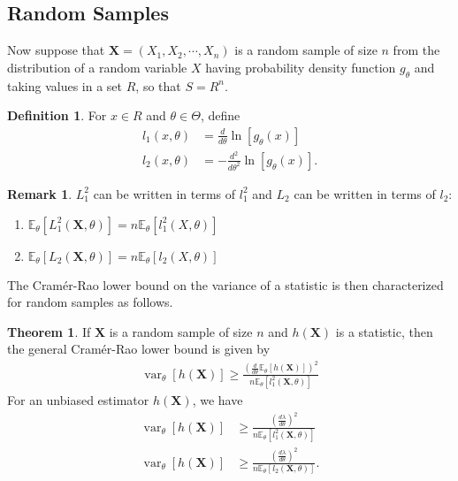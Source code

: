 \documentclass[a4paper,12pt]{article}
\theoremstyle{definition}
\newtheorem{theorem}{Theorem}[section]
\theoremstyle{definition}
\theoremstyle{definition}
\newtheorem{definition}{Definition}[section]
\newtheorem*{remark}{Remark}
\newcommand{\bs}{\boldsymbol}
\newcommand{\var}{\operatorname{var}}
\begin{document}
    \subsection*{Random Samples}
    Now suppose that $\bs{X} = (X_1, X_2, \cdots, X_n)$ is a random sample of size $n$ from the distribution of a random variable $X$ having probability density function $g_\theta$ and taking values in a set $R$, so that $S = R^n$.
    \begin{definition}
        For $x \in R$ and $\theta \in \Theta$, define
        \begin{align*}
            l_1(x, \theta) &= \frac{d}{d\theta} \ln[g_\theta(x)] \\
            l_2(x, \theta) &= -\frac{d^2}{d\theta^2} \ln[g_\theta(x)].
        \end{align*}
    \end{definition}
    \begin{remark}
        $L_1^2$ can be written in terms of $l_1^2$ and $L_2$ can be written in terms of $l_2$:
        \begin{enumerate}[label=\alph*.]
            \item
                $\mathbb{E}_\theta \left[ L_1^2(\bs{X}, \theta) \right] = n \mathbb{E}_\theta \left[ l_1^2(X, \theta) \right]$
            \item
                $\mathbb{E}_\theta \left[ L_2(\bs{X}, \theta) \right] = n \mathbb{E}_\theta \left[ l_2(X, \theta) \right]$
        \end{enumerate}
    \end{remark}
    The Cram\'er-Rao lower bound on the variance of a statistic is then characterized for random samples as follows.
    \begin{theorem}
        If $\bs{X}$ is a random sample of size $n$ and $h(\bs{X})$ is a statistic, then the general Cram\'er-Rao lower bound is given by
        \begin{align*}
            \var_\theta[h(\bs{X})] \geq \frac{\left( \frac{d}{d\theta} \mathbb{E}_\theta[h(\bs{X})] \right)^2}{n \mathbb{E}_\theta \left[ l_1^2(\bs{X}, \theta) \right]}
        \end{align*}
        For an unbiased estimator $h(\bs{X})$, we have
        \begin{align*}
            \var_\theta[h(\bs{X})] &\geq \frac{\left( \frac{d\lambda}{d\theta} \right)^2}{n \mathbb{E}_\theta \left[ l_1^2(\bs{X}, \theta) \right]} \\
            \var_\theta[h(\bs{X})] &\geq \frac{\left( \frac{d\lambda}{d\theta} \right)^2}{n \mathbb{E}_\theta \left[ l_2(\bs{X}, \theta) \right]}.
        \end{align*}
    \end{theorem}
\end{document}
